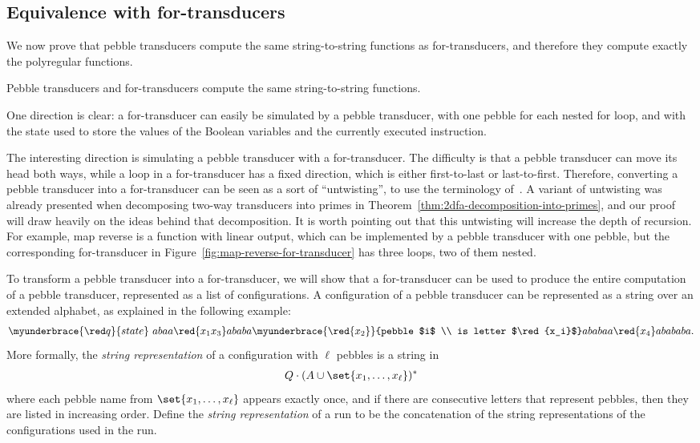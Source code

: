 \subsection{Equivalence with for-transducers} 
We now prove that pebble transducers compute the same string-to-string functions as for-transducers, and therefore they compute exactly the polyregular functions.


\begin{theorem}\label{thm:pebble-are-for}
   Pebble transducers and for-transducers compute the same string-to-string functions.
\end{theorem}

One direction is clear: a for-transducer can easily be simulated by a pebble transducer, with one pebble for each nested for loop, and with the state used to store the values of the Boolean variables and the currently executed instruction. 

The interesting direction is simulating a pebble transducer with a for-transducer.
The difficulty is that a pebble transducer can move its head both ways, while a loop in a for-transducer has a fixed direction, which is either first-to-last or last-to-first.  Therefore, converting a pebble transducer into a for-transducer can be seen as a sort of ``untwisting'', to use the terminology of~\cite{baschenis2017}. A variant of untwisting was already presented when decomposing two-way transducers into primes in Theorem~\ref{thm:2dfa-decomposition-into-primes}, and our proof will draw heavily on the ideas behind that decomposition. It is worth pointing out that this untwisting will increase the depth of recursion. For example, map reverse is a function with linear output, which can be implemented by a pebble transducer with one pebble, but the corresponding for-transducer in Figure~\ref{fig:map-reverse-for-transducer} has three loops, two of them nested.




To transform a pebble transducer into a for-transducer, we will show that a for-transducer can be used to produce the entire computation of a pebble transducer, represented as a list of configurations.
A configuration of a pebble transducer can be represented as a string over an extended alphabet, as explained in the following example:
\begin{align*}
\myunderbrace{\red q}{state}\ abaa \red{x_1 x_3} ababa \myunderbrace{\red{x_2}}{pebble $i$ \\ is letter $\red{x_i}$} ababaa \red{x_4} abababa.
\end{align*}
More formally, the \emph{string representation} of a configuration with $\ell$ pebbles is a string in 
\begin{align*}
Q \cdot (A \cup \set{x_1,\ldots,x_\ell})^*
\end{align*}
where each pebble name from $\set{x_1,\ldots,x_\ell}$ appears exactly once, and if there are consecutive letters that represent pebbles, then they are listed in increasing order. Define the \emph{string representation} of a run to be the concatenation of the string representations of the configurations used in the run. 


